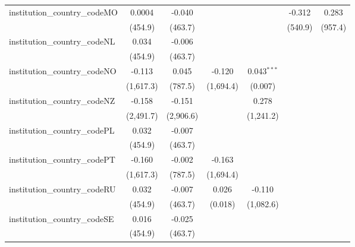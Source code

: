 \begin{tabular}{lcccccc}
   institution\_country\_codeMO          & 0.0004        & -0.040        &                &                & -0.312    & 0.283\\   
                                         & (454.9)       & (463.7)       &                &                & (540.9)   & (957.4)\\   
   institution\_country\_codeNL          & 0.034         & -0.006        &                &                &           &   \\   
                                         & (454.9)       & (463.7)       &                &                &           &   \\   
   institution\_country\_codeNO          & -0.113        & 0.045         & -0.120         & 0.043$^{***}$  &           &   \\   
                                         & (1,617.3)     & (787.5)       & (1,694.4)      & (0.007)        &           &   \\   
   institution\_country\_codeNZ          & -0.158        & -0.151        &                & 0.278          &           &   \\   
                                         & (2,491.7)     & (2,906.6)     &                & (1,241.2)      &           &   \\   
   institution\_country\_codePL          & 0.032         & -0.007        &                &                &           &   \\   
                                         & (454.9)       & (463.7)       &                &                &           &   \\   
   institution\_country\_codePT          & -0.160        & -0.002        & -0.163         &                &           &   \\   
                                         & (1,617.3)     & (787.5)       & (1,694.4)      &                &           &   \\   
   institution\_country\_codeRU          & 0.032         & -0.007        & 0.026          & -0.110         &           &   \\   
                                         & (454.9)       & (463.7)       & (0.018)        & (1,082.6)      &           &   \\   
   institution\_country\_codeSE          & 0.016         & -0.025        &                &                &           &   \\   
                                         & (454.9)       & (463.7)       &                &                &           &   \\   

\end{tabular}
